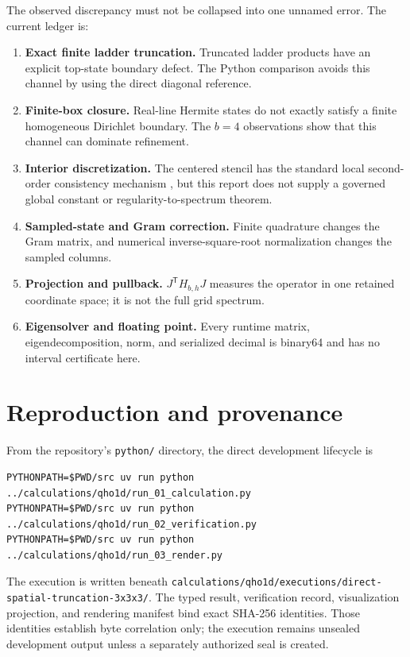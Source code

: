 \documentclass[11pt]{article}
\newcommand{\code}[1]{\texttt{#1}}
\begin{document}
The observed discrepancy must not be collapsed into one unnamed error.  The current
ledger is:
\begin{enumerate}
\item \textbf{Exact finite ladder truncation.} Truncated ladder products have an
explicit top-state boundary defect.  The Python comparison avoids this channel by
using the direct diagonal reference.
\item \textbf{Finite-box closure.} Real-line Hermite states do not exactly satisfy a
finite homogeneous Dirichlet boundary.  The $b=4$ observations show that this channel
can dominate refinement.
\item \textbf{Interior discretization.} The centered stencil has the standard local
second-order consistency mechanism \cite{strikwerda2004}, but this report does not
supply a governed global
constant or regularity-to-spectrum theorem.
\item \textbf{Sampled-state and Gram correction.} Finite quadrature changes the Gram
matrix, and numerical inverse-square-root normalization changes the sampled columns.
\item \textbf{Projection and pullback.} $J^{\mathsf T}H_{b,h}J$ measures the operator
in one retained coordinate space; it is not the full grid spectrum.
\item \textbf{Eigensolver and floating point.} Every runtime matrix, eigendecomposition,
norm, and serialized decimal is binary64 and has no interval certificate here.
\end{enumerate}

\section{Reproduction and provenance}

From the repository's \code{python/} directory, the direct development lifecycle is
\begin{verbatim}
PYTHONPATH=$PWD/src uv run python ../calculations/qho1d/run_01_calculation.py
PYTHONPATH=$PWD/src uv run python ../calculations/qho1d/run_02_verification.py
PYTHONPATH=$PWD/src uv run python ../calculations/qho1d/run_03_render.py
\end{verbatim}
The execution is written beneath
\code{calculations/qho1d/executions/direct-spatial-truncation-3x3x3/}.  The typed
result, verification record, visualization projection, and rendering manifest bind
exact SHA-256 identities.  Those identities establish byte correlation only; the
execution remains unsealed development output unless a separately authorized seal is
created.
\end{document}
